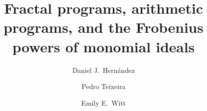 \documentclass[11pt]{amsart}
\renewcommand{\tt}{\mathsf{t}}
\begin{document}
\title[Fractal and arithmetic programs]{Fractal programs, arithmetic programs, and the Frobenius powers of monomial ideals}
\author{Daniel J.~Hern\'andez}
\author{Pedro Teixeira}
\author{Emily E.~Witt}
\maketitle

\newcommand{\CheckedBox}{\text{\rlap{$\checkmark$}}\Box}
\end{document}
